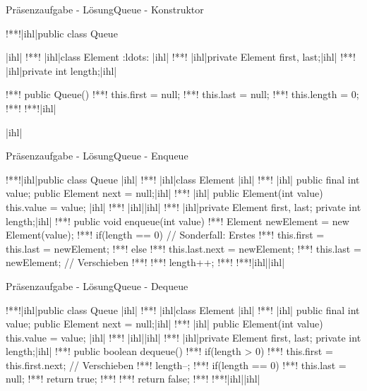 \begin{frame}[c,fragile]{Präsenzaufgabe - Lösung\hfill Queue - Konstruktor}
\SetupLstHl
\begin{plainjava}
!**!|ihl|public class Queue {|ihl|
!**!    |ihl|class Element { :ldots: }|ihl|
!**!    |ihl|private Element first, last;|ihl|
!**!    |ihl|private int length;|ihl|

!**!    public Queue() {
!**!        this.first = null;
!**!        this.last = null;
!**!        this.length = 0;
!**!    }
!**!|ihl|}|ihl|
\end{plainjava}
\end{frame}

\begin{frame}[c,fragile]{Präsenzaufgabe - Lösung\hfill Queue - Enqueue}
\SetupLstHl{}
\begin{plainjava}
!**!|ihl|public class Queue {|ihl|
!**!    |ihl|class Element {|ihl|
!**!    |ihl|    public final int value;  public Element next = null;|ihl|
!**!    |ihl|    public Element(int value) { this.value = value; }|ihl|
!**!    |ihl|}|ihl|
!**!    |ihl|private Element first, last;   private int length;|ihl|
!**!    public void enqueue(int value) {
!**!        Element newElement = new Element(value);
!**!        if(length == 0) { // Sonderfall: Erstes
!**!            this.first = this.last = newElement;
!**!        } else {
!**!            this.last.next = newElement;
!**!            this.last = newElement; // Verschieben
!**!        }
!**!        length++;
!**!    }
!**!|ihl|}|ihl|
\end{plainjava}
\end{frame}

\begin{frame}[c,fragile]{Präsenzaufgabe - Lösung\hfill Queue - Dequeue}
\SetupLstHl{}
\begin{plainjava}
!**!|ihl|public class Queue {|ihl|
!**!    |ihl|class Element {|ihl|
!**!    |ihl|    public final int value;  public Element next = null;|ihl|
!**!    |ihl|    public Element(int value) { this.value = value; }|ihl|
!**!    |ihl|}|ihl|
!**!    |ihl|private Element first, last;   private int length;|ihl|
!**!    public boolean dequeue() {
!**!        if(length > 0) {
!**!            this.first = this.first.next; // Verschieben
!**!            length--;
!**!            if(length == 0)
!**!                this.last = null;
!**!            return true;
!**!        }
!**!        return false;
!**!    }
!**!|ihl|}|ihl|
\end{plainjava}
\end{frame}

